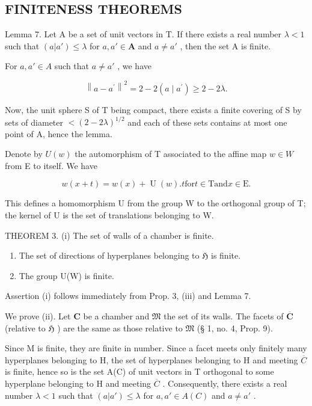 \subsection{FINITENESS THEOREMS}

Lemma 7. Let A be a set of unit vectors in T. If there exists a real number \(\lambda < 1\) such that \((a|a') \leqslant \lambda\) for \(a, a' \in \mathbf{A}\) and \(a \neq a'\) , then the set A is finite.

For \(a, a' \in A\) such that \(a \neq a'\) , we have

\[
\left\| a - a ^ {\prime} \right\| ^ {2} = 2 - 2 (a \mid a ^ {\prime}) \geqslant 2 - 2 \lambda .
\]

Now, the unit sphere S of T being compact, there exists a finite covering of S by sets of diameter \(<(2-2\lambda)^{1/2}\) and each of these sets contains at most one point of A, hence the lemma.

Denote by \(U(w)\) the automorphism of T associated to the affine map \(w \in W\) from E to itself. We have

\[
w (x + t) = w (x) + \operatorname{U} (w). t \text {for} t \in \mathrm{T} \text {and} x \in \mathrm{E}.
\]

This defines a homomorphism U from the group W to the orthogonal group of T; the kernel of U is the set of translations belonging to W.

THEOREM 3. (i) The set of walls of a chamber is finite.

\begin{enumerate}
\def\labelenumi{(\roman{enumi})}
\setcounter{enumi}{1}
\item
  The set of directions of hyperplanes belonging to \(\mathfrak{H}\) is finite.
\item
  The group U(W) is finite.
\end{enumerate}

Assertion (i) follows immediately from Prop. 3, (iii) and Lemma 7.

We prove (ii). Let \(\mathbf{C}\) be a chamber and \(\mathfrak{M}\) the set of its walls. The facets of \(\overline{\mathbf{C}}\) (relative to \(\mathfrak{H}\) ) are the same as those relative to \(\mathfrak{M}\) (§ 1, no. 4, Prop. 9).

Since M is finite, they are finite in number. Since a facet meets only finitely many hyperplanes belonging to H, the set of hyperplanes belonging to H and meeting \(\overline{C}\) is finite, hence so is the set A(C) of unit vectors in T orthogonal to some hyperplane belonging to H and meeting \(\overline{C}\) . Consequently, there exists a real number \(\lambda < 1\) such that \((a|a') \leqslant \lambda\) for \(a, a' \in A(C)\) and \(a \neq a'\) .

